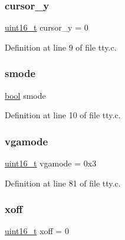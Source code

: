 \subsubsection{\texorpdfstring{cursor\+\_\+y}{cursor\_y}}
{\footnotesize\ttfamily \hyperlink{a00140_a273cf69d639a59973b6019625df33e30_a273cf69d639a59973b6019625df33e30}{uint16\+\_\+t} cursor\+\_\+y = 0}



Definition at line 9 of file tty.\+c.

\mbox{\label{a00179_a22b8d30f7aee33f172c1239aed53e7db_a22b8d30f7aee33f172c1239aed53e7db}} 
\subsubsection{\texorpdfstring{smode}{smode}}
{\footnotesize\ttfamily \hyperlink{a00140_af6a258d8f3ee5206d682d799316314b1_af6a258d8f3ee5206d682d799316314b1}{bool} smode}



Definition at line 10 of file tty.\+c.

\mbox{\label{a00179_af93b0649fdd1bea5b6d29ed37205aa2c_af93b0649fdd1bea5b6d29ed37205aa2c}} 
\subsubsection{\texorpdfstring{vgamode}{vgamode}}
{\footnotesize\ttfamily \hyperlink{a00140_a273cf69d639a59973b6019625df33e30_a273cf69d639a59973b6019625df33e30}{uint16\+\_\+t} vgamode = 0x3}



Definition at line 81 of file tty.\+c.

\mbox{\label{a00179_abaa0d20f0e52ce0d3a7d706f6ac16266_abaa0d20f0e52ce0d3a7d706f6ac16266}} 
\subsubsection{\texorpdfstring{xoff}{xoff}}
{\footnotesize\ttfamily \hyperlink{a00140_a273cf69d639a59973b6019625df33e30_a273cf69d639a59973b6019625df33e30}{uint16\+\_\+t} xoff = 0}



